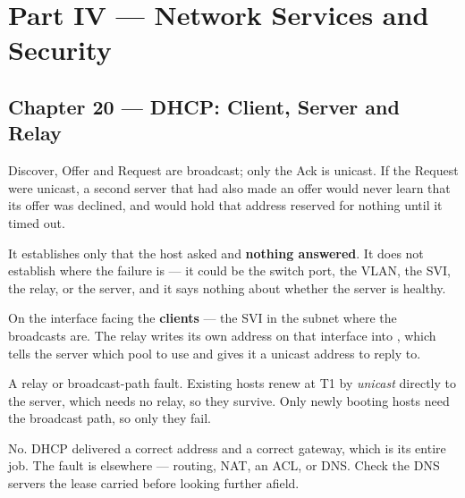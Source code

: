 \section*{Part IV --- Network Services and Security}

\subsection*{Chapter 20 --- DHCP: Client, Server and Relay}
\begin{tightnum}
  \item Discover, Offer and Request are broadcast; only the Ack is unicast. If the
        Request were unicast, a second server that had also made an offer would
        never learn that its offer was declined, and would hold that address
        reserved for nothing until it timed out.
  \item It establishes only that the host asked and \textbf{nothing answered}. It
        does not establish where the failure is --- it could be the switch port,
        the VLAN, the SVI, the relay, or the server, and it says nothing about
        whether the server is healthy.
  \item On the interface facing the \textbf{clients} --- the SVI in the subnet
        where the broadcasts are. The relay writes its own address on that
        interface into , which tells the server which pool to use and
        gives it a unicast address to reply to.
  \item A relay or broadcast-path fault. Existing hosts renew at T1 by
        \emph{unicast} directly to the server, which needs no relay, so they
        survive. Only newly booting hosts need the broadcast path, so only they
        fail.
  \item No. DHCP delivered a correct address and a correct gateway, which is its
        entire job. The fault is elsewhere --- routing, NAT, an ACL, or DNS. Check
        the DNS servers the lease carried before looking further afield.
\end{tightnum}

